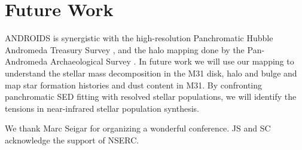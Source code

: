 \documentclass[11pt,twoside]{article}
\begin{document}
\section{Future Work}

ANDROIDS is synergistic with the high-resolution Panchromatic Hubble Andromeda Treasury Survey \citep{Dalcanton:2012}, and the halo mapping done by the Pan-Andromeda Archaeological Survey \citep{McConnachie:2009}.
In future work we will use our mapping to understand the stellar mass decomposition in the M31 disk, halo and bulge and map star formation histories and dust content in M31.
By confronting panchromatic SED fitting with resolved stellar populations, we will identify the tensions in near-infrared stellar population synthesis.

\acknowledgements We thank Marc Seigar for organizing a wonderful conference. JS and SC acknowledge the support of NSERC.


\end{document}
